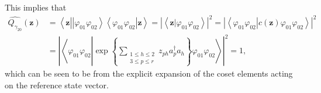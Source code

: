 \documentclass[aps,preprint]{revtex4}%
\begin{document}
This implies that
\begin{align}
\widehat{Q_{\gamma_{20}}}\left(  \mathbf{z}\right)   &  =\left\langle
\mathbf{z}\left\vert \left\vert \varphi_{01}\varphi_{02}\right\rangle
\left\langle \varphi_{01}\varphi_{02}\right\vert \right.  \mathbf{z}%
\right\rangle =\left\vert \left\langle \left.  \mathbf{z}\right\vert
\varphi_{01}\varphi_{02}\right\rangle \right\vert ^{2}=\left\vert \left\langle
\left.  \varphi_{01}\varphi_{02}\right\vert c\left(  \mathbf{z}\right)
\varphi_{01}\varphi_{02}\right\rangle \right\vert ^{2}\nonumber\\
&  =\left\vert \left\langle \varphi_{01}\varphi_{02}\left\vert \exp\left\{
\sum\limits_{\substack{1\leq h\leq2\\3\leq p\leq r}}z_{ph}a_{p}^{\dagger}%
a_{h}\right\}  \varphi_{01}\varphi_{02}\right.  \right\rangle \right\vert
^{2}=1,
\end{align}
which can be seen to be from the explicit expansion of the coset elements
acting on the reference state vector.
\end{document}
